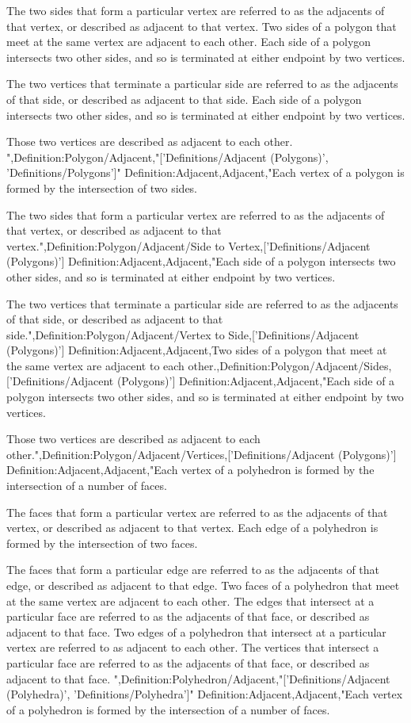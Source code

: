 The two sides that form a particular vertex are referred to as the adjacents of that vertex, or described as adjacent to that vertex.
Two sides of a polygon that meet at the same vertex are adjacent to each other.
Each side of a polygon intersects two other sides, and so is terminated at either endpoint by two vertices.

The two vertices that terminate a particular side are referred to as the adjacents of that side, or described as adjacent to that side.
Each side of a polygon intersects two other sides, and so is terminated at either endpoint by two vertices.


Those two vertices are described as adjacent to each other.
",Definition:Polygon/Adjacent,"['Definitions/Adjacent (Polygons)', 'Definitions/Polygons']"
Definition:Adjacent,Adjacent,"Each vertex of a polygon is formed by the intersection of two sides.

The two sides that form a particular vertex are referred to as the adjacents of that vertex, or described as adjacent to that vertex.",Definition:Polygon/Adjacent/Side to Vertex,['Definitions/Adjacent (Polygons)']
Definition:Adjacent,Adjacent,"Each side of a polygon intersects two other sides, and so is terminated at either endpoint by two vertices.

The two vertices that terminate a particular side are referred to as the adjacents of that side, or described as adjacent to that side.",Definition:Polygon/Adjacent/Vertex to Side,['Definitions/Adjacent (Polygons)']
Definition:Adjacent,Adjacent,Two sides of a polygon that meet at the same vertex are adjacent to each other.,Definition:Polygon/Adjacent/Sides,['Definitions/Adjacent (Polygons)']
Definition:Adjacent,Adjacent,"Each side of a polygon intersects two other sides, and so is terminated at either endpoint by two vertices.


Those two vertices are described as adjacent to each other.",Definition:Polygon/Adjacent/Vertices,['Definitions/Adjacent (Polygons)']
Definition:Adjacent,Adjacent,"Each vertex of a polyhedron is formed by the intersection of a number of faces.

The faces that form a particular vertex are referred to as the adjacents of that vertex, or described as adjacent to that vertex.
Each edge of a polyhedron is formed by the intersection of two faces.

The faces that form a particular edge are referred to as the adjacents of that edge, or described as adjacent to that edge.
Two faces of a polyhedron that meet at the same vertex are adjacent to each other.
The edges that intersect at a particular face are referred to as the adjacents of that face, or described as adjacent to that face.
Two edges of a polyhedron that intersect at a particular vertex are referred to as adjacent to each other.
The vertices that intersect a particular face are referred to as the adjacents of that face, or described as adjacent to that face.
",Definition:Polyhedron/Adjacent,"['Definitions/Adjacent (Polyhedra)', 'Definitions/Polyhedra']"
Definition:Adjacent,Adjacent,"Each vertex of a polyhedron is formed by the intersection of a number of faces.

